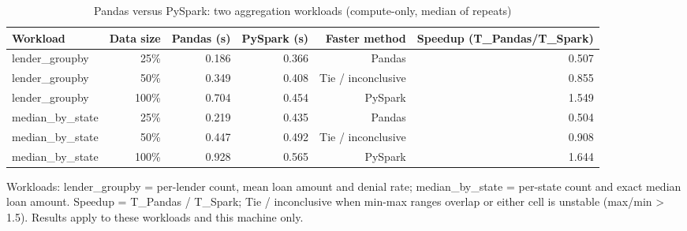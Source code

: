 \begin{table}[t]
\centering
\caption{Pandas versus PySpark: two aggregation workloads (compute-only, median of repeats)}
\label{tab:table3_benchmark}
\small
\begin{tabular}{lrrrrr}
\toprule
Workload & Data size & Pandas (s) & PySpark (s) & Faster method & Speedup (T\_Pandas/T\_Spark) \\
\midrule
lender\_groupby & 25\% & 0.186 & 0.366 & Pandas & 0.507 \\
lender\_groupby & 50\% & 0.349 & 0.408 & Tie / inconclusive & 0.855 \\
lender\_groupby & 100\% & 0.704 & 0.454 & PySpark & 1.549 \\
median\_by\_state & 25\% & 0.219 & 0.435 & Pandas & 0.504 \\
median\_by\_state & 50\% & 0.447 & 0.492 & Tie / inconclusive & 0.908 \\
median\_by\_state & 100\% & 0.928 & 0.565 & PySpark & 1.644 \\
\bottomrule
\end{tabular}
\par\footnotesize Workloads: lender\_groupby = per-lender count, mean loan amount and denial rate; median\_by\_state = per-state count and exact median loan amount. Speedup = T\_Pandas / T\_Spark; Tie / inconclusive when min-max ranges overlap or either cell is unstable (max/min > 1.5). Results apply to these workloads and this machine only.
\end{table}
